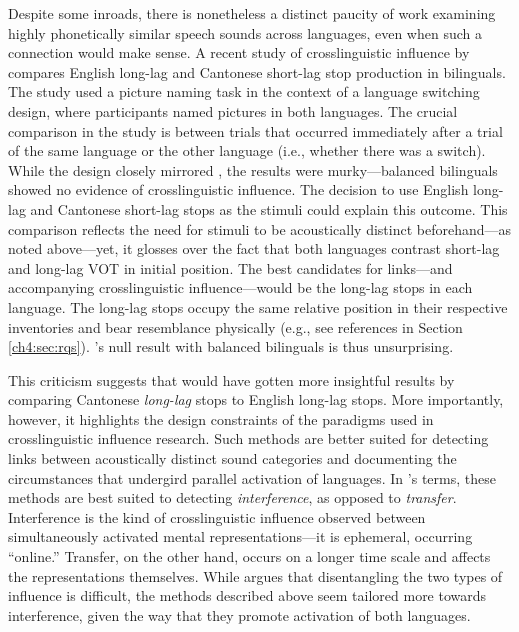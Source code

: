 Despite some inroads, there is nonetheless a distinct paucity of work examining highly phonetically similar speech sounds across languages, even when such a connection would make sense. A recent study of crosslinguistic influence by \citet{tsui_2019_switching} compares English long-lag and Cantonese short-lag stop production in bilinguals. The study used a picture naming task in the context of a language switching design, where participants named pictures in both languages. The crucial comparison in the study is between trials that occurred immediately after a trial of the same language or the other language (i.e., whether there was a switch). While the design closely mirrored \citet{goldrick_2014_switching}, the results were murky---balanced bilinguals showed no evidence of crosslinguistic influence. The decision to use English long-lag and Cantonese short-lag stops as the stimuli could explain this outcome. This comparison reflects the need for stimuli to be acoustically distinct beforehand---as noted above---yet, it glosses over the fact that both languages contrast short-lag and long-lag VOT in initial position. The best candidates for links---and accompanying crosslinguistic influence---would be the long-lag stops in each language. The long-lag stops occupy the same relative position in their respective inventories and bear resemblance physically (e.g., see references in Section \ref{ch4:sec:rqs}). \citeauthor{tsui_2019_switching}'s \citeyearpar{tsui_2019_switching} null result with balanced bilinguals is thus unsurprising. 

This criticism suggests that \citep{tsui_2019_switching} would have gotten more insightful results by comparing Cantonese \textit{long-lag} stops to English long-lag stops. More importantly, however, it highlights the design constraints of the paradigms used in crosslinguistic influence research. Such methods are better suited for detecting links between acoustically distinct sound categories and documenting the circumstances that undergird parallel activation of languages. In \citeauthor{grosjean_2011_transfer}'s \citeyearpar{grosjean_2011_transfer} terms, these methods are best suited to detecting \textit{interference}, as opposed to \textit{transfer}. Interference is the kind of crosslinguistic influence observed between simultaneously activated mental representations---it is ephemeral, occurring ``online.'' Transfer, on the other hand, occurs on a longer time scale and affects the representations themselves. While \citet{grosjean_2011_transfer} argues that disentangling the two types of influence is difficult, the methods described above seem tailored more towards interference, given the way that they promote activation of both languages.

